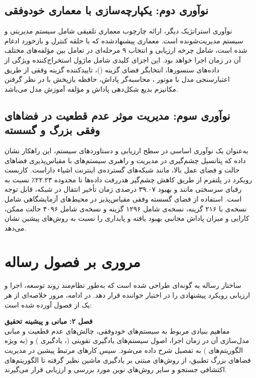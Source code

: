 \documentclass[oneside,openany,phd]{TMU-Thesis}
\begin{document}
\subsection{نوآوری دوم: یکپارچه‌سازی  با معماری خودوفقی }
نوآوری استراتژیک دیگر، ارائه چارچوب معماری تلفیقی شامل سیستم مدیریتی و سیستم مدیریت‌شونده است. معماری پیشنهادشده که با حلقه کنترل و بازخورد  ادغام شده است، شامل چرخه ارزیابی و انتخاب ۹ مرحله‌ای در تعامل بین مؤلفه‌های مختلف آن در زمان اجرا خواهد بود.
این اجزای کلیدی شامل ماژول استخراج‌کننده ویژگی از داده‌های سنسورها، انتخابگر فضای گزینه ()، تایید‌کننده گزینه وفقی از طریق اعتبارسنجی مدل با موتور ، محاسبه‌گر پاداش، حافظه بازپخش با در نظر گرفتن مکانیزم بدیع شکل‌دهی پاداش و مؤلفه آموزش مدل می‌باشد.

\subsection{نوآوری سوم: مدیریت موثر عدم قطعیت در فضاهای وفقی بزرگ و گسسته}
به‌عنوان یک نوآوری اساسی در سطح ارزیابی و دستاوردهای سیستم، این راهکار نشان داده که پتانسیل چشم‌گیری در مدیریت و راهبری سیستم‌های با مقیاس‌پذیری فضاهای حالت و فضای عمل بالا، مانند شبکه‌های گسترده‌ی اینترنت اشیاء داراست.
کاربست رویکرد  در پلتفرم  از طریق کاهش چشم‌گیر هدررفت داده‌ها تا محدوده ۲۲.۲۳٪ نسبت به رقبای سرسختی مانند  و بهبود ۳۹.۰۷ درصدی زمان تأخیر انتقال در شبکه، قابل توجه است. استفاده از فضای گسسته وفقی مقیاس‌پذیر در محیط‌های آزمایشگاهی شامل نسخه‌ی  با ۲۱۶ گزینه، نسخه‌ی  شامل ۱۲۹۶ گزینه و نسخه‌ی  شامل ۴۰۹۶ حالت ممکن، کارایی و میزان پاداش مجانبی بهبود یافته و پایداری را نسبت به روش‌های پیشین نشان می‌دهد.

\section{مروری بر فصول رساله}

ساختار رساله به گونه‌ای طراحی شده است که به‌طور نظام‌مند روند توسعه، اجرا و ارزیابی رویکرد پیشنهادی را در اختیار خواننده قرار دهد. در ادامه، مرور خلاصه‌ای از هر یک از فصول آورده شده است:

\textbf{فصل ۲: مبانی و پیشینه تحقیق}\\
مفاهیم بنیادی مربوط به سیستم‌های خودوفقی، چالش‌های عدم قطعیت و مبانی مدل‌سازی آن در زمان اجرا، اصول سیستم‌های یادگیری تقویتی (، یادگیری ) و  (به ویژه الگوریتم‌های ) به تفصیل شرح داده می‌شود. سپس کارهای مرتبط پیشین در مدیریت فضاهای بزرگ تطبیق، از روش‌های مبتنی بر یادگیری ماشین نظیر  گرفته تا الگوریتم‌های اکتشافی جستجو و سایر روش‌های نوین مورد بررسی و ارزیابی قرار می‌گیرند.
\end{document}
